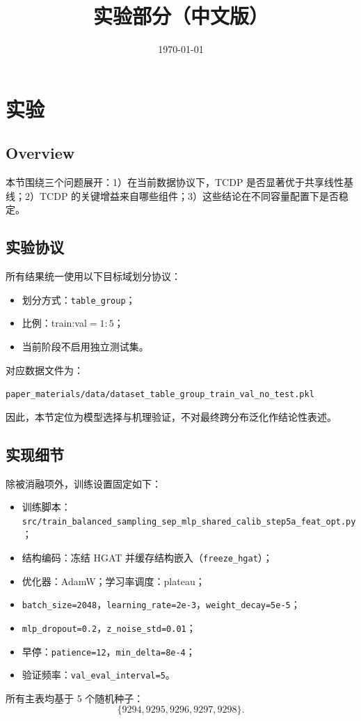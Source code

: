 ﻿\documentclass[12pt,a4paper]{ctexart}
\title{实验部分（中文版）}
\author{}
\date{\today}
\begin{document}
\maketitle

\section{实验}
\label{sec:experiments_cn}

\subsection{Overview}

本节围绕三个问题展开：1）在当前数据协议下，TCDP 是否显著优于共享线性基线；2）TCDP 的关键增益来自哪些组件；3）这些结论在不同容量配置下是否稳定。

\subsection{实验协议}

所有结果统一使用以下目标域划分协议：
\begin{itemize}[leftmargin=1.2em]
  \item 划分方式：\texttt{table\_group}；
  \item 比例：train:val$=1:5$；
  \item 当前阶段不启用独立测试集。
\end{itemize}
对应数据文件为：
\begin{center}
\texttt{paper\_materials/data/dataset\_table\_group\_train\_val\_no\_test.pkl}
\end{center}
因此，本节定位为模型选择与机理验证，不对最终跨分布泛化作结论性表述。

\subsection{实现细节}

除被消融项外，训练设置固定如下：
\begin{itemize}[leftmargin=1.2em]
  \item 训练脚本：\texttt{src/train\_balanced\_sampling\_sep\_mlp\_shared\_calib\_step5a\_feat\_opt.py}；
  \item 结构编码：冻结 HGAT 并缓存结构嵌入（\texttt{freeze\_hgat}）；
  \item 优化器：AdamW；学习率调度：plateau；
  \item \texttt{batch\_size=2048}，\texttt{learning\_rate=2e-3}，\texttt{weight\_decay=5e-5}；
  \item \texttt{mlp\_dropout=0.2}，\texttt{z\_noise\_std=0.01}；
  \item 早停：\texttt{patience=12}，\texttt{min\_delta=8e-4}；
  \item 验证频率：\texttt{val\_eval\_interval=5}。
\end{itemize}
所有主表均基于 5 个随机种子：
\[
\{9294,9295,9296,9297,9298\}.
\]
\end{document}
